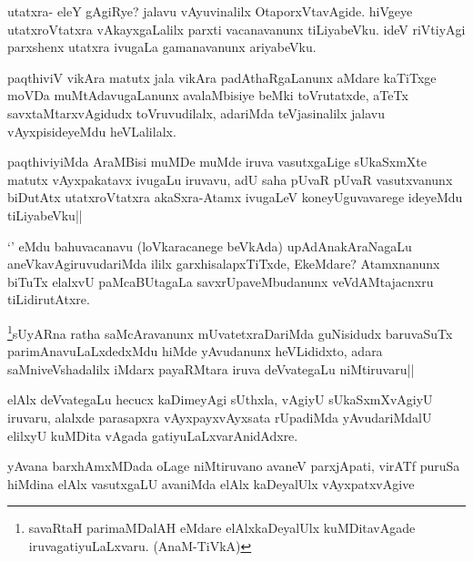 \begin{artha}
utatxra- eleY gAgiRye? jalavu vAyuvinalilx OtaporxVtavAgide. hiVgeye utatxroVtatxra vAkayxgaLalilx parxti vacanavanunx tiLiyabeVku. ideV riVtiyAgi parxshenx utatxra ivugaLa gamanavanunx ariyabeVku.
\end{artha}


\begin{artha}
paqthiviV vikAra matutx jala vikAra padAthaRgaLanunx aMdare kaTiTxge moVDa muMtAdavugaLanunx avalaMbisiye beMki toVrutatxde, aTeTx savxtaMtarxvAgidudx toVruvudilalx, adariMda teVjasinalilx jalavu vAyxpisideyeMdu heVLalilalx.
\end{artha}

\begin{artha}%
paqthiviyiMda AraMBisi muMDe muMde iruva vasutxgaLige sUkaSxmXte matutx vAyxpakatavx ivugaLu iruvavu, adU saha pUvaR pUvaR vasutxvanunx biDutAtx utatxroVtatxra akaSxra-Atamx ivugaLeV koneyUguvavarege ideyeMdu tiLiyabeVku||
\end{artha}

\begin{artha}
`\stext ' eMdu bahuvacanavu (loVkaracanege beVkAda) upAdAnakAraNagaLu aneVkavAgiruvudariMda ililx garxhisalapxTiTxde, EkeMdare? Atamxnanunx biTuTx elalxvU paMcaBUtagaLa savxrUpaveMbudanunx veVdAMtajacnxru tiLidirutAtxre.
\end{artha}

\begin{artha}
\footnote[1]{savaRtaH parimaMDalAH eMdare elAlxkaDeyalUlx kuMDitavAgade iruvagatiyuLaLxvaru. (AnaM-TiVkA)}sUyARna ratha saMcAravanunx mUvatetxraDariMda guNisidudx baruvaSuTx parimAnavuLaLxdedxMdu hiMde yAvudanunx heVLididxto, adara saMniveVshadalilx iMdarx payaRMtara iruva deVvategaLu niMtiruvaru||
\end{artha}

\begin{artha}
elAlx deVvategaLu hecucx kaDimeyAgi sUthxla, vAgiyU sUkaSxmXvAgiyU iruvaru, alalxde parasapxra vAyxpayxvAyxsata rUpadiMda yAvudariMdalU elilxyU kuMDita vAgada gatiyuLaLxvarAnidAdxre.
\end{artha}


\begin{artha}
yAvana barxhAmxMDada oLage niMtiruvano avaneV parxjApati, virATf puruSa hiMdina elAlx vasutxgaLU avaniMda elAlx kaDeyalUlx vAyxpatxvAgive
\end{artha}

